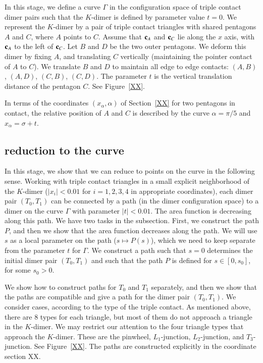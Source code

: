 In this stage, we define a curve $\Gamma$ in the configuration space of triple contact dimer pairs such that the $K$-dimer
is defined by parameter value $t=0$.  We represent the $K$-dimer by a pair of triple contact triangles with shared pentagons
$A$ and $C$, where $A$ points to $C$.  Assume that ${\mathbf c}_A$ and ${\mathbf c}_C$ lie along the $x$ axis, with ${\mathbf c}_A$ to the left
of ${\mathbf c}_C$.  Let $B$ and $D$ be the two outer pentagons.  We deform this dimer by fixing $A$,
and translating $C$ vertically (maintaining the pointer contact of $A$ to $C$).  We translate $B$ and $D$ to maintain
all edge to edge contacts: $(A,B)$, $(A,D)$, $(C,B)$, $(C,D)$.   The parameter $t$ is the vertical translation distance of the pentagon $C$.
See Figure~\ref{XX}.

In terms of the coordinates $(x_\alpha,\alpha)$ of Section~\ref{XX} for two pentagons in contact, the relative position of $A$ and $C$
is described by the curve $\alpha=\pi/5$ and $x_\alpha = \sigma+t$.


\subsection{reduction to the curve}

In this stage, we show that we can reduce to points on the curve in the following sense.
Working with triple contact triangles in a small explicit neighborhood of the
$K$-dimer ($|x_i|<0.01$ for $i=1,2,3,4$ in appropriate coordinates),
each dimer pair $(T_0,T_1)$ can be connected by a path (in the dimer configuration
space) to a dimer on the curve $\Gamma$ with parameter $|t|<0.01$.
The area function is decreasing along this path.
We have two tasks in the subsection.  First, we construct the path $P$, and 
then we show that the area function decreases along the path.  We will use
$s$ as a local parameter on the path ($s\mapsto P(s)$), 
which we need to keep separate from
the parameter $t$ for $\Gamma$.  We construct a path such that $s=0$ determines the
initial dimer pair $(T_0,T_1)$ and such that the path $P$ is defined for $s\in [0,s_0]$, for some $s_0>0$.

We show how to construct paths for $T_0$ and $T_1$ separately, and then
we show that the paths are compatible and give a path for the dimer pair $(T_0,T_1)$.
We consider cases, according to the type of the triple contact.
As mentioned above, there are $8$ types for each triangle, but most of them do not
approach a triangle in the $K$-dimer.  We may restrict our attention
to the four triangle types that approach the $K$-dimer.   These are the pinwheel, $L_1$-junction,
$L_2$-junction, and $T_3$-junction.  See Figure~\ref{XX}.
The paths are constructed explicitly in the coordinate section XX.

